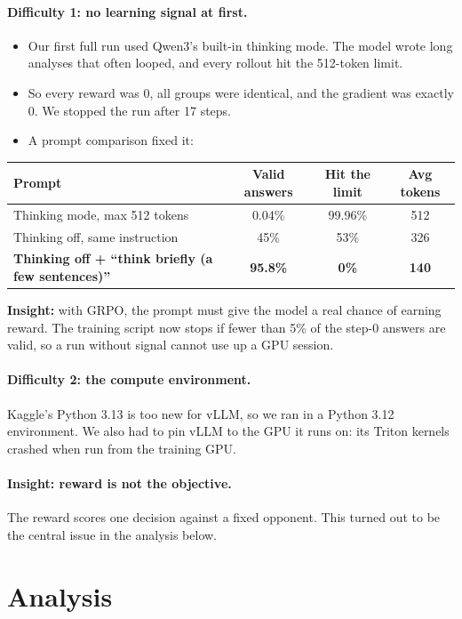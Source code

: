 \documentclass[10.5pt]{article}
\begin{document}
\paragraph{Difficulty 1: no learning signal at first.}
\begin{itemize}
\item Our first full run used Qwen3's built-in thinking mode. The model wrote long analyses that often looped, and every
  rollout hit the 512-token limit.
\item So every reward was 0, all groups were identical, and the gradient was exactly 0. We stopped the run after 17 steps.
\item A prompt comparison fixed it:
\end{itemize}
\begin{center}\small
\begin{tabular}{lccc}
\toprule
Prompt & Valid answers & Hit the limit & Avg tokens\\
\midrule
Thinking mode, max 512 tokens & 0.04\% & 99.96\% & 512\\
Thinking off, same instruction & 45\% & 53\% & 326\\
\textbf{Thinking off + ``think briefly (a few sentences)''} & \textbf{95.8\%} & \textbf{0\%} & \textbf{140}\\
\bottomrule
\end{tabular}
\end{center}
\textbf{Insight:} with GRPO, the prompt must give the model a real chance of earning reward. The training script now stops
if fewer than 5\% of the step-0 answers are valid, so a run without signal cannot use up a GPU session.

\paragraph{Difficulty 2: the compute environment.} Kaggle's Python 3.13 is too new for vLLM, so we ran in a Python 3.12
environment. We also had to pin vLLM to the GPU it runs on: its Triton kernels crashed when run from the training GPU.

\paragraph{Insight: reward is not the objective.} The reward scores one decision against a fixed opponent. This turned out
to be the central issue in the analysis below.

\section{Analysis}
\end{document}
